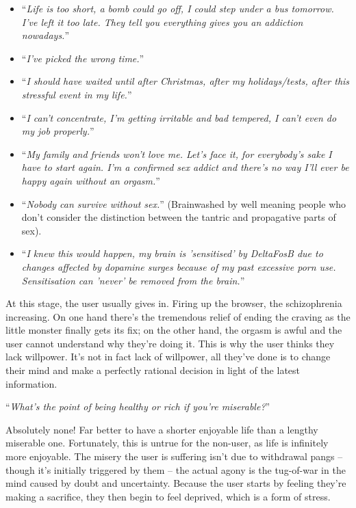 \documentclass[
]{book}
\begin{document}
\begin{itemize}
\item
  ``\emph{Life is too short, a bomb could go off, I could step under a bus tomorrow. I've left it too late. They tell you everything gives you an addiction nowadays.}''
\item
  ``\emph{I've picked the wrong time.}''
\item
  ``\emph{I should have waited until after Christmas, after my holidays/tests, after this stressful event in my life.}''
\item
  ``\emph{I can't concentrate, I'm getting irritable and bad tempered, I can't even do my job properly.}''
\item
  ``\emph{My family and friends won't love me. Let's face it, for everybody's sake I have to start again. I'm a confirmed sex addict and there's no way I'll ever be happy again without an orgasm.}''
\item
  ``\emph{Nobody can survive without sex.}'' (Brainwashed by well meaning people who don't consider the distinction between the tantric and propagative parts of sex).
\item
  ``\emph{I knew this would happen, my brain is 'sensitised' by DeltaFosB due to changes affected by dopamine surges because of my past excessive porn use. Sensitisation can 'never' be removed from the brain.}''
\end{itemize}

At this stage, the user usually gives in. Firing up the browser, the schizophrenia increasing. On one hand there's the tremendous relief of ending the craving as the little monster finally gets its fix; on the other hand, the orgasm is awful and the user cannot understand why they're doing it. This is why the user thinks they lack willpower. It's not in fact lack of willpower, all they've done is to change their mind and make a perfectly rational decision in light of the latest information.

``\emph{What's the point of being healthy or rich if you're miserable?}''

Absolutely none! Far better to have a shorter enjoyable life than a lengthy miserable one. Fortunately, this is untrue for the non-user, as life is infinitely more enjoyable. The misery the user is suffering isn't due to withdrawal pangs -- though it's initially triggered by them -- the actual agony is the tug-of-war in the mind caused by doubt and uncertainty. Because the user starts by feeling they're making a sacrifice, they then begin to feel deprived, which is a form of stress.
\end{document}
